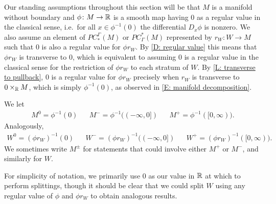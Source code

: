 Our standing assumptions throughout this section will be that $M$ is a manifold without boundary and $\phi \colon M \to \mathbb{R}$ is a smooth map having $0$ as a regular value in the classical sense, i.e.\ for all $x \in \phi^{-1}(0)$ the differential $D_x\phi$ is nonzero.
We also assume an element of $PC_*^\Gamma(M)$ or $PC^*_\Gamma(M)$ represented by $r_W \colon W \to M$ such that $0$ is also a regular value for $\phi r_W$.
By \cref{D: regular value} this means that $\phi r_W$ is transverse to $0$, which is equivalent to assuming $0$ is a regular value in the classical sense for the restriction of $\phi r_W$ to each stratum of $W$.
By \cref{L: transverse to pullback}, $0$ is a regular value for $\phi r_W$ precisely when $r_W$ is transverse to $0 \times_{\mathbb{R}} M$, which is simply $\phi^{-1}(0)$, as observed in \cref{E: manifold decomposition}.

We let
\begin{align*}
M^0 = \phi^{-1}(0) && M^- = \phi^{-1}((-\infty,0]) &&M^+ = \phi^{-1}([0,\infty)).
\end{align*}
 Analogously,
\begin{align*}
W^0 = (\phi r_W)^{-1}(0) && W^- = (\phi r_W)^{-1}((-\infty,0]) && W^+ = (\phi r_W)^{-1}([0,\infty)).
\end{align*}
We sometimes write $M^\pm$ for statements that could involve either $M^+$ or $M^-$, and similarly for $W$.

\begin{remark}
	For simplicity of notation, we primarily use $0$ as our value in $\mathbb{R}$ at which to perform splittings, though it should be clear that we could split $W$ using any regular value of $\phi$ and $\phi r_W$ to obtain analogous results.
\end{remark}

\begin{comment}
\begin{lemma}\label{L: 0 transverse M0}
	Zero is a regular value for $\phi r_W$ if and only if $r_W$ is transverse to the inclusion of $M^0$ into $M$.
\end{lemma}
\begin{proof}
	As $0$ is a regular value for $\phi$, by classical differential topology $M^0$ is an embedded codimension-one submanifold of $M$, and in a neighborhood of each point of $M^0$, the map $\phi$ behaves up to diffeomorphisms like the standard projection of $\R^m$ to the first coordinate; see Section 1.4 \cite{GuPo74}.
	In particular, at each $z \in M^0$, we have $T_zM^0 = \ker(D_z\phi)$.
	So the linear subspace spanned by a vector $v \in T_zM$ is transverse to $T_zM^0$ if and only if its image under $D_z\phi$ is non-zero.
	It follows that $r_W$ is transverse to $M^0$ if and only if $\phi r_W$ is transverse to $0$.
\end{proof}
\end{comment}

